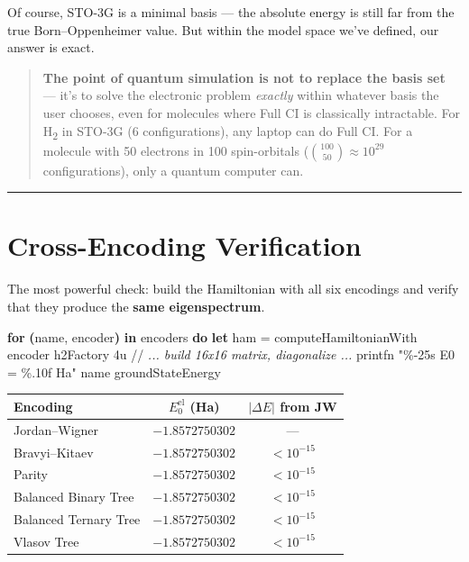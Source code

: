 \documentclass[
  11pt,
  oneside]{book}
\newenvironment{Shaded}{\begin{snugshade}}{\end{snugshade}}
\newcommand{\CommentTok}[1]{\textcolor[rgb]{0.56,0.35,0.01}{\textit{#1}}}
\newcommand{\DecValTok}[1]{\textcolor[rgb]{0.00,0.00,0.81}{#1}}
\newcommand{\KeywordTok}[1]{\textcolor[rgb]{0.13,0.29,0.53}{\textbf{#1}}}
\newcommand{\NormalTok}[1]{#1}
\newcommand{\OperatorTok}[1]{\textcolor[rgb]{0.81,0.36,0.00}{\textbf{#1}}}
\newcommand{\StringTok}[1]{\textcolor[rgb]{0.31,0.60,0.02}{#1}}
\begin{document}
Of course, STO-3G is a minimal basis --- the absolute energy is still
far from the true Born--Oppenheimer value. But within the model space
we've defined, our answer is exact.

\begin{quote}
\textbf{The point of quantum simulation is not to replace the basis set}
--- it's to solve the electronic problem \emph{exactly} within whatever
basis the user chooses, even for molecules where Full CI is classically
intractable. For H\textsubscript{2} in STO-3G (6 configurations), any laptop can do Full
CI. For a molecule with 50 electrons in 100 spin-orbitals
(\(\binom{100}{50} \approx 10^{29}\) configurations), only a quantum
computer can.
\end{quote}

\begin{center}\rule{0.5\linewidth}{0.5pt}\end{center}

\section{Cross-Encoding Verification}\label{cross-encoding-verification}

The most powerful check: build the Hamiltonian with all six encodings
and verify that they produce the \textbf{same eigenspectrum}.

\begin{Shaded}
\begin{Highlighting}[]
\KeywordTok{for} \OperatorTok{(}\NormalTok{name, encoder}\OperatorTok{)} \KeywordTok{in}\NormalTok{ encoders }\KeywordTok{do}
    \KeywordTok{let}\NormalTok{ ham = computeHamiltonianWith encoder h2Factory }\DecValTok{4}\NormalTok{u}
\NormalTok{    //}\CommentTok{ ... build 16x16 matrix, diagonalize ...}
\NormalTok{    printfn }\StringTok{"\%{-}25s  E0 = \%.10f Ha"}\NormalTok{ name groundStateEnergy}
\end{Highlighting}
\end{Shaded}

\begin{longtable}[]{@{}lcc@{}}
\toprule\noalign{}
Encoding & \(E_0^\text{el}\) (Ha) & \(\lvert\Delta E\rvert\) from JW \\
\midrule\noalign{}
\endhead
\bottomrule\noalign{}
\endlastfoot
Jordan--Wigner & \(-1.8572750302\) & --- \\
Bravyi--Kitaev & \(-1.8572750302\) & \(< 10^{-15}\) \\
Parity & \(-1.8572750302\) & \(< 10^{-15}\) \\
Balanced Binary Tree & \(-1.8572750302\) & \(< 10^{-15}\) \\
Balanced Ternary Tree & \(-1.8572750302\) & \(< 10^{-15}\) \\
Vlasov Tree & \(-1.8572750302\) & \(< 10^{-15}\) \\
\end{longtable}
\end{document}
